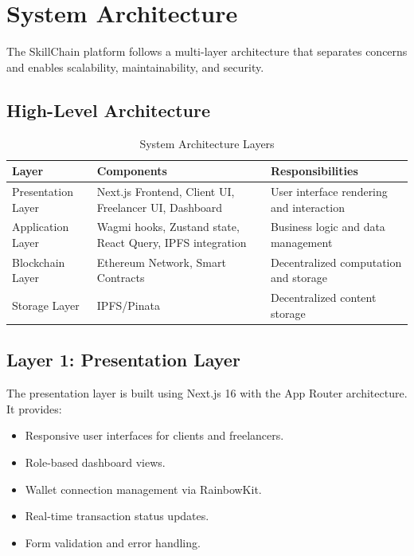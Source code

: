 \section{System Architecture}

The SkillChain platform follows a multi-layer architecture that separates concerns and enables scalability, maintainability, and security.

\subsection{High-Level Architecture}

\begin{table}[H]
\centering
\caption{System Architecture Layers}
\begin{tabular}{|p{3cm}|p{5cm}|p{5cm}|}
\hline
\textbf{Layer} & \textbf{Components} & \textbf{Responsibilities} \\
\hline
Presentation Layer & Next.js Frontend, Client UI, Freelancer UI, Dashboard & User interface rendering and interaction \\
\hline
Application Layer & Wagmi hooks, Zustand state, React Query, IPFS integration & Business logic and data management \\
\hline
Blockchain Layer & Ethereum Network, Smart Contracts & Decentralized computation and storage \\
\hline
Storage Layer & IPFS/Pinata & Decentralized content storage \\
\hline
\end{tabular}
\end{table}

\subsection{Layer 1: Presentation Layer}

The presentation layer is built using Next.js 16 with the App Router architecture. It provides:

\begin{itemize}
    \item Responsive user interfaces for clients and freelancers.
    \item Role-based dashboard views.
    \item Wallet connection management via RainbowKit.
    \item Real-time transaction status updates.
    \item Form validation and error handling.
\end{itemize}

